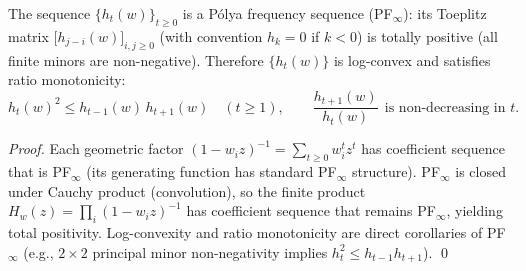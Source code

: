 \begin{theorem}\label{thm:pom-complete-homogeneous-pf-infty}
The sequence \(\{h_t(w)\}_{t\ge0}\) is a Pólya frequency sequence (PF\(_\infty\)):
its Toeplitz matrix \(\bigl[h_{j-i}(w)\bigr]_{i,j\ge0}\) (with convention \(h_k=0\) if \(k<0\)) is totally positive (all finite minors are non-negative).
Therefore \(\{h_t(w)\}\) is log-convex and satisfies ratio monotonicity:
\[
h_t(w)^2\le h_{t-1}(w)\,h_{t+1}(w)\quad(t\ge1),
\qquad
\frac{h_{t+1}(w)}{h_t(w)}\ \ \text{is non-decreasing in \(t\)}.
\]
\end{theorem}
\begin{proof}
Each geometric factor \((1-w_i z)^{-1}=\sum_{t\ge0} w_i^t z^t\) has coefficient sequence that is PF\(_\infty\) (its generating function has standard PF\(_\infty\) structure).
PF\(_\infty\) is closed under Cauchy product (convolution), so the finite product \(H_w(z)=\prod_i(1-w_i z)^{-1}\) has coefficient sequence that remains PF\(_\infty\), yielding total positivity.
Log-convexity and ratio monotonicity are direct corollaries of PF\(_\infty\) (e.g., \(2\times2\) principal minor non-negativity implies \(h_t^2\le h_{t-1}h_{t+1}\)). \qed
\end{proof}


